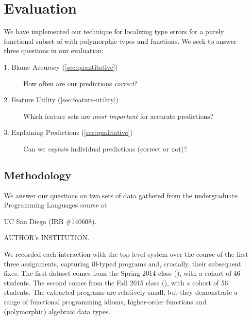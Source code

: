 \section{Evaluation}
\label{sec:evaluation}


We have implemented our technique for localizing type errors for a
purely functional subset of \ocaml with polymorphic types and functions.
%
We seek to answer three questions in our evaluation:
%
\begin{description}
\item[1. Blame Accuracy (\autoref{sec:quantitative})]
  How often are our predictions \emph{correct}?
\item[2. Feature Utility (\autoref{sec:feature-utility})]
  Which feature sets are \emph{most important} for accurate predictions?
\item[3. Explaining Predictions (\autoref{sec:qualitative})]
  Can we \emph{explain} individual predictions (correct or not)?
\end{description}

\subsection{Methodology}
\label{sec:methodology}

We answer our questions on two sets of data gathered from the
undergraduate Programming Languages course at
\begin{anonsuppress}
UC San Diego (IRB \#140608).
\end{anonsuppress}
\begin{noanonsuppress}
AUTHOR's INSTITUTION.
\end{noanonsuppress}
%
We recorded each interaction with the \ocaml top-level system over the
course of the first three assignments, capturing
ill-typed programs and, crucially, their subsequent fixes.
%
The first dataset comes from the Spring 2014 class (\SPRING), with a
cohort of 46 students. The second comes from the Fall 2015 class
(\FALL), with a cohort of 56 students.
%
The extracted programs are relatively small, but they demonstrate a
range of functional programming idioms, \eg higher-order functions and
(polymorphic) algebraic data types.

